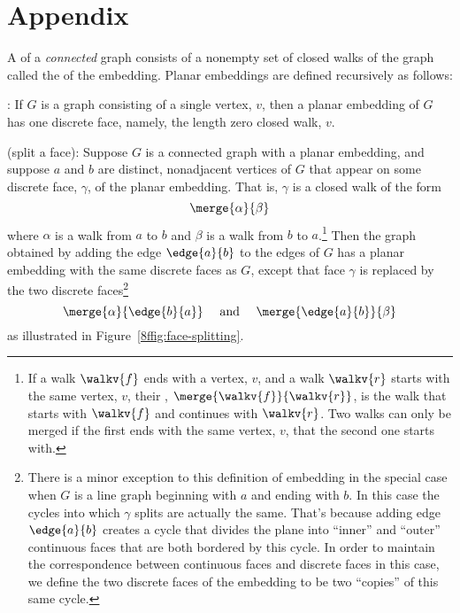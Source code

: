 \documentclass[handout]{mcs}
\begin{document}
\fi

\section*{Appendix}

\begin{definition*} %
A  of a \emph{connected} graph consists of a
nonempty set of closed walks of the graph called the  of the embedding.  Planar embeddings are defined recursively as
follows:

: If $G$ is a graph consisting of a single
vertex, $v$, then a planar embedding of $G$ has one discrete face,
namely, the length zero closed walk, $v$.

 (split a face): Suppose $G$ is a
connected graph with a planar embedding, and suppose $a$ and $b$ are
distinct, nonadjacent vertices of $G$ that appear on some discrete
face, $\gamma$, of the planar embedding.  That is, $\gamma$ is a
closed walk of the form
\[
\merge{\alpha}{\beta}
\]
where $\alpha$ is a walk from $a$ to $b$ and $\beta$ is a walk from
$b$ to $a$.\footnote{
If a walk $\walkv{f}$ ends with a vertex, $v$, and a walk
$\walkv{r}$ starts with the same vertex, $v$, their
, $\merge{\walkv{f}}{\walkv{r}}$, is the walk that starts
with $\walkv{f}$ and continues with $\walkv{r}$.  Two walks can only
be merged if the first ends with the same vertex, $v$, that the second
one starts with.}
Then the graph obtained by adding the edge $\edge{a}{b}$ to the edges
of $G$ has a planar embedding with the same discrete faces as $G$,
except that face $\gamma$ is replaced by the two discrete
faces\footnote{There is a minor exception to this definition
of embedding in the special case when $G$ is a line graph beginning
with $a$ and ending with $b$.  In this case the cycles into which
$\gamma$ splits are actually the same.  That's because adding edge
$\edge{a}{b}$ creates a cycle that divides the plane into ``inner''
and ``outer'' continuous faces that are both bordered by this cycle.
In order to maintain the correspondence between continuous faces and
discrete faces in this case, we define the two discrete faces of the
embedding to be two ``copies'' of this same cycle.}
\[
\merge{\alpha}{\edge{b}{a}}
 \quad \text{ and } \quad \merge{\edge{a}{b}}{\beta}
\]
as illustrated in Figure~\ref{8ffig:face-splitting}.


\end{definition*}
\end{document}
